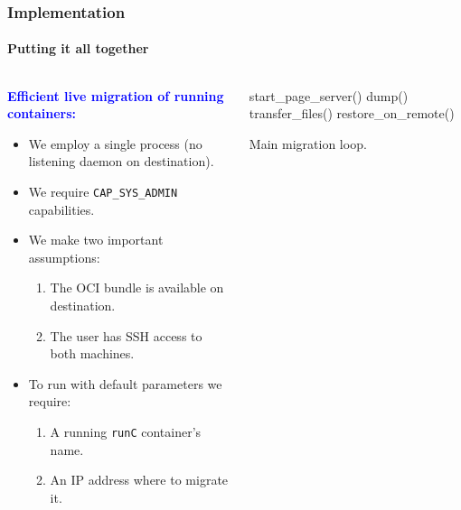 \documentclass[9pt,    %
    english,            %
    xcolor=table,       %
    envcountsect,        %
    aspectratio=169     %
]{beamer}
\begin{document}
\begin{frame}
    \frametitle{Implementation}
    \framesubtitle{Putting it all together}

    \begin{columns}
        \begin{column}{.5\textwidth}

            \vspace{-40pt}

            \textbf{\textcolor{blue}{Efficient live migration of running containers:}}
            \begin{itemize}
                \item We employ a single process (no listening daemon on destination).
                \item We require \texttt{CAP\_SYS\_ADMIN} capabilities.
                \item We make two important assumptions:
                \begin{enumerate}
                    \item The OCI bundle is available on destination.\\[3pt]
                    \item The user has SSH access to both machines.
                \end{enumerate}
                \item To run with default parameters we require:
                \begin{enumerate}
                    \item A running \texttt{runC} container's name.\\[3pt]
                    \item An IP address where to migrate it.
                \end{enumerate}
            \end{itemize}
        \end{column}
        \begin{column}{.5\textwidth}
            \begin{algorithm2e}[H]
                \SetAlgoLined
                start\_page\_server()\;
                dump()\;
                transfer\_files()\;
                restore\_on\_remote()\;
                \caption{Main migration loop.}
            \end{algorithm2e}
        \end{column}
    \end{columns}
    
\end{frame}
\end{document}
